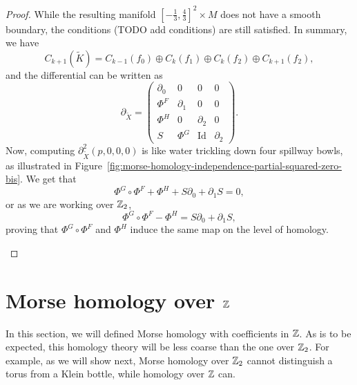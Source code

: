 \begin{proof}
While the resulting manifold $[-\frac{1}{3}, \frac{4}{3}]^2 \times M$ does not have a smooth boundary, the conditions (TODO add conditions) are still satisfied.
In summary, we have
\[
    C_{k+1}(\tilde{K}) = C_{k-1}(f_0) \oplus C_k(f_1) \oplus C_k(f_2) \oplus C_{k+1}(f_2)
,\] 
and the differential can be written as
\[
\partial_{\tilde{X}} = \begin{pmatrix}
    \partial_0 & 0 & 0 & 0\\
    \Phi^{F} &\partial_1 & 0 & 0 \\
    \Phi^{H} & 0 & \partial_2 & 0 \\
    S & \Phi^{G} & \operatorname{Id} & \partial_2
\end{pmatrix}
.\] 
Now, computing $\partial_{\tilde{X}}^2(p, 0, 0, 0)$ is like water trickling down four spillway bowls, as illustrated in Figure~\ref{fig:morse-homology-independence-partial-squared-zero-bis}. We get that
\[
\Phi^{G}  \circ  \Phi^{F} + \Phi^{H} + S \partial_0 + \partial_1 S = 0
,\] 
or as we are working over $\mathbb{Z}_2$,
\[
    \Phi^{G}  \circ \Phi^{F} - \Phi^{H} = S \partial_0 + \partial_1 S
,\] 
proving that $\Phi^{G}  \circ \Phi^{F}$ and $\Phi^{H}$ induce the same map on the level of homology.

\begin{figure*}
    \centering
    \vspace*{2cm}
\end{figure*}
\end{proof}


\section{Morse homology over $\mathbb{Z}$}
In this section, we will defined Morse homology with coefficients in $\mathbb{Z}$.
As is to be expected, this homology theory will be less coarse than the one over $\mathbb{Z}_2$. For example, as we will show next, Morse homology over $\mathbb{Z}_2$ cannot distinguish a torus from a Klein bottle, while homology over $\mathbb{Z}$ can.

